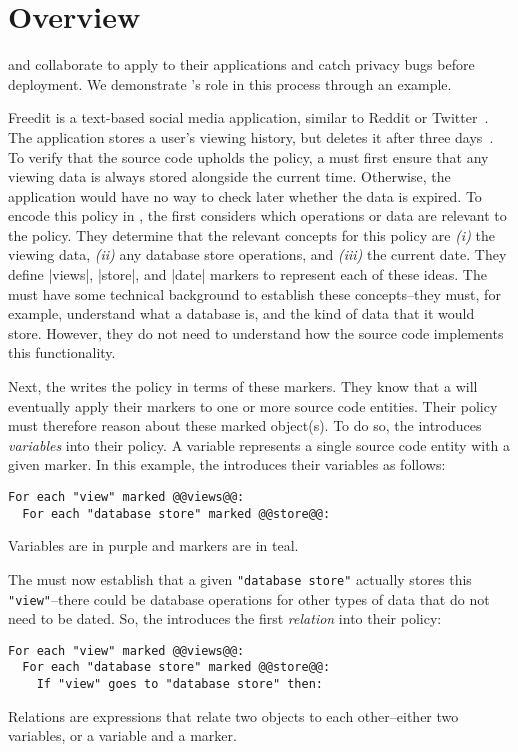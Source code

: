 \chapter{Overview}
\label{sec:overview}

\Ces{} and \devs{} collaborate to apply \sys{} to their applications and catch privacy bugs before deployment.
%
We demonstrate \syslang's role in this process through an example.

Freedit is a text-based social media application, similar to Reddit or Twitter~\cite{freedit}.
%
The application stores a user's viewing history, but deletes it after three days~\cite{freedit-pageviews}.
%
To verify that the source code upholds the policy, a \ce{} must first ensure that any viewing data is always stored alongside the current time.
%
Otherwise, the application would have no way to check later whether the data is expired.
%
To encode this policy in \syslang{}, the \ce{} first considers which operations or data are relevant to the policy.
%
They determine that the relevant concepts for this policy are \emph{(i)} the viewing data,
\emph{(ii)} any database store operations, and \emph{(iii)} the current date.
%
They define |views|, |store|, and |date| markers to represent each of these ideas.
%
The \ce{} must have some technical background to establish these concepts--they must, for example, understand what a database is,
and the kind of data that it would store.
%
However, they do not need to understand how the source code implements this functionality.
%

Next, the \ce{} writes the policy in terms of these markers.
%
They know that a \dev{} will eventually apply their markers to one or more source code entities.
%
Their policy must therefore reason about these marked object(s).
%
To do so, the \ce{} introduces \emph{variables} into their policy.
%
A variable represents a single source code entity with a given marker.
%
In this example, the \ce{} introduces their variables as follows:
\begin{lstlisting}[language=CNL]
For each "view" marked @@views@@:
  For each "database store" marked @@store@@:
\end{lstlisting}
%
Variables are in purple and markers are in teal.

The \ce{} must now establish that a given \lstinline[language=CNL]|"database store"| actually stores this \lstinline[language=CNL]|"view"|--there could be database operations for other types of data that do not need to be dated.
%
So, the \ce{} introduces the first \emph{relation} into their policy:
\begin{lstlisting}[language=CNL]
For each "view" marked @@views@@:
  For each "database store" marked @@store@@:
    If "view" goes to "database store" then:
\end{lstlisting}
%
Relations are expressions that relate two objects to each other--either two variables, or a variable and a marker.

